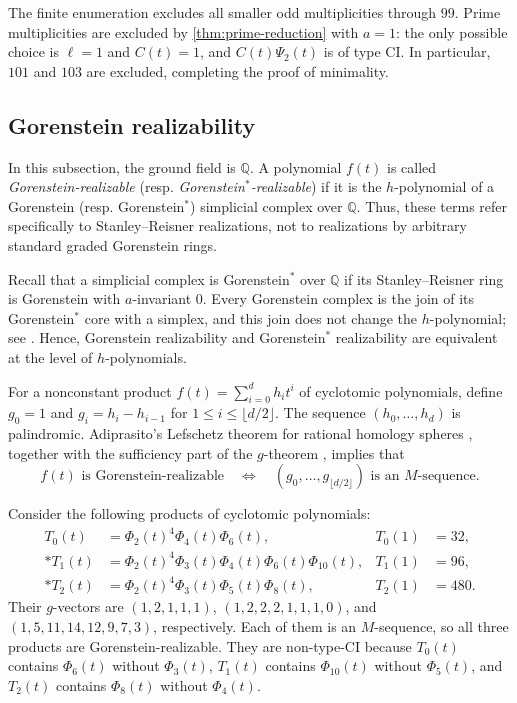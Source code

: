 \documentclass[11pt,a4paper]{amsart}
\theoremstyle{definition}
\theoremstyle{remark}
\newcommand{\QQ}{\mathbb Q}
\begin{document}
The finite enumeration excludes all smaller odd multiplicities through $99$. Prime multiplicities are excluded by \cref{thm:prime-reduction} with $a=1$: the only possible choice is $\ell=1$ and $C(t)=1$, and $C(t)\Psi_2(t)$ is of type CI. In particular, $101$ and $103$ are excluded, completing the proof of minimality.

\subsection{Gorenstein realizability}\label{subsec:gorenstein}
In this subsection, the ground field is $\QQ$. A polynomial $f(t)$ is called \emph{Gorenstein-realizable} (resp. \emph{Gorenstein$^*$-realizable}) if it is the $h$-polynomial of a Gorenstein (resp. Gorenstein$^*$) simplicial complex over $\QQ$. Thus, these terms refer specifically to Stanley--Reisner realizations, not to realizations by arbitrary standard graded Gorenstein rings.

Recall that a simplicial complex is Gorenstein$^*$ over $\QQ$ if its Stanley--Reisner ring is Gorenstein with $a$-invariant $0$. Every Gorenstein complex is the join of its Gorenstein$^*$ core with a simplex, and this join does not change the $h$-polynomial; see \cite[Section~5.6]{BrunsHerzog}. Hence, Gorenstein realizability and Gorenstein$^*$ realizability are equivalent at the level of $h$-polynomials.

For a nonconstant product $f(t)=\sum_{i=0}^d h_it^i$ of cyclotomic polynomials, define $g_0=1$ and $g_i=h_i-h_{i-1}$ for $1\le i\le\lfloor d/2\rfloor$. The sequence $(h_0,\ldots,h_d)$ is palindromic. Adiprasito's Lefschetz theorem for rational homology spheres \cite[Theorem~9.1]{Adiprasito}, together with the sufficiency part of the $g$-theorem \cite{BilleraLee,Stanley1980}, implies that
\begin{equation}\label{eq:gorenstein-criterion}
f(t)\text{ is Gorenstein-realizable}\quad\Longleftrightarrow\quad(g_0,\ldots,g_{\lfloor d/2\rfloor})\text{ is an }M\text{-sequence}.
\end{equation}

Consider the following products of cyclotomic polynomials:
\begin{align*}
T_0(t)&=\Phi_2(t)^4\Phi_4(t)\Phi_6(t),&T_0(1)&=32,\\*
T_1(t)&=\Phi_2(t)^4\Phi_3(t)\Phi_4(t)\Phi_6(t)\Phi_{10}(t),&T_1(1)&=96,\\*
T_2(t)&=\Phi_2(t)^4\Phi_3(t)\Phi_5(t)\Phi_8(t),&T_2(1)&=480.
\end{align*}
Their $g$-vectors are $(1,2,1,1,1)$, $(1,2,2,2,1,1,1,0)$, and $(1,5,11,14,12,9,7,3)$, respectively. Each of them is an $M$-sequence, so all three products are Gorenstein-realizable. They are non-type-CI because $T_0(t)$ contains $\Phi_6(t)$ without $\Phi_3(t)$, $T_1(t)$ contains $\Phi_{10}(t)$ without $\Phi_5(t)$, and $T_2(t)$ contains $\Phi_8(t)$ without $\Phi_4(t)$.
\end{document}
